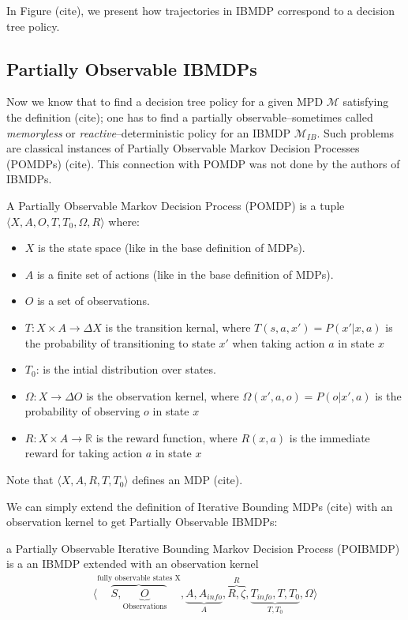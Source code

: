 In Figure (cite), we present how trajectories in IBMDP correspond to a decision tree policy.

\subsection{Partially Observable IBMDPs}

Now we know that to find a decision tree policy for a given MPD $\mathcal{M}$ satisfying the definition (cite); one has to find a partially observable--sometimes called \textit{memoryless} or \textit{reactive}--deterministic policy for an IBMDP $\mathcal{M}_{IB}$.
Such problems are classical instances of Partially Observable Markov Decision Processes (POMDPs) (cite). This connection with POMDP was not done by the authors of IBMDPs. 

\begin{definition}
A Partially Observable Markov Decision Process (POMDP) is a tuple $\langle X, A, O, T, T_0, \Omega, R\rangle$ where:
\begin{itemize}
    \item $X$ is the state space (like in the base definition of MDPs).
    \item $A$ is a finite set of actions (like in the base definition of MDPs).
    \item $O$ is a set of observations.
    \item $T: X \times A \rightarrow \Delta X$ is the transition kernal, where $T(s, a, x') = P(x'|x, a)$ is the probability of transitioning to state $x'$ when taking action $a$ in state $x$
    \item $T_0$: is the intial distribution over states. 
    \item $\Omega: X \rightarrow \Delta O$ is the observation kernel, where $\Omega(x', a, o) = P(o|x', a)$ is the probability of observing $o$ in state $x$
    \item $R: X \times A \rightarrow \mathbb{R}$ is the reward function, where $R(x, a)$ is the immediate reward for taking action $a$ in state $x$
\end{itemize}
Note that $\langle X, A, R, T, T_0 \rangle$ defines an MDP (cite).
\end{definition}

We can simply extend the definition of Iterative Bounding MDPs (cite) with an observation kernel to get Partially Observable IBMDPs:
\begin{definition} a Partially Observable Iterative Bounding Markov Decision Process (POIBMDP) is a an IBMDP extended with an observation kernel 
    \begin{align*}
        \langle \overbrace{S, \underbrace{O}_{\text{Observations}}}^{\text{fully observable states X}}, \underbrace{A, A_{info}}_{A}, \overbrace{R, \zeta}^{R}, \underbrace{T_{info}, T, T_0}_{T, T_0}, \Omega \rangle
    \end{align*}
\end{definition}

